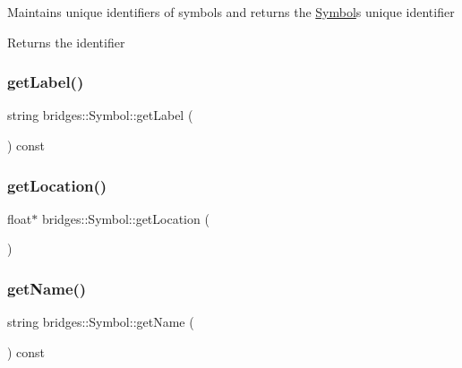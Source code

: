 Maintains unique identifiers of symbols and returns the \mbox{\hyperlink{classbridges_1_1_symbol}{Symbol}}\textquotesingle{}s unique identifier

\begin{DoxyReturn}{Returns}
the identifier 
\end{DoxyReturn}
\mbox{\label{classbridges_1_1_symbol_a6d19ee38cdb8a07a19cf53840e93cbbb}} 
\subsubsection{\texorpdfstring{get\+Label()}{getLabel()}}
{\footnotesize\ttfamily string bridges\+::\+Symbol\+::get\+Label (\begin{DoxyParamCaption}{ }\end{DoxyParamCaption}) const\hspace{0.3cm}{\ttfamily [inline]}}

\mbox{\label{classbridges_1_1_symbol_a97f8b30d76dd0d8dd49167628bb3f810}} 
\subsubsection{\texorpdfstring{get\+Location()}{getLocation()}}
{\footnotesize\ttfamily float$\ast$ bridges\+::\+Symbol\+::get\+Location (\begin{DoxyParamCaption}{ }\end{DoxyParamCaption})\hspace{0.3cm}{\ttfamily [inline]}}

\mbox{\label{classbridges_1_1_symbol_a798c3871fe791a841ab0e558807e5c6b}} 
\subsubsection{\texorpdfstring{get\+Name()}{getName()}}
{\footnotesize\ttfamily string bridges\+::\+Symbol\+::get\+Name (\begin{DoxyParamCaption}{ }\end{DoxyParamCaption}) const\hspace{0.3cm}{\ttfamily [inline]}}

